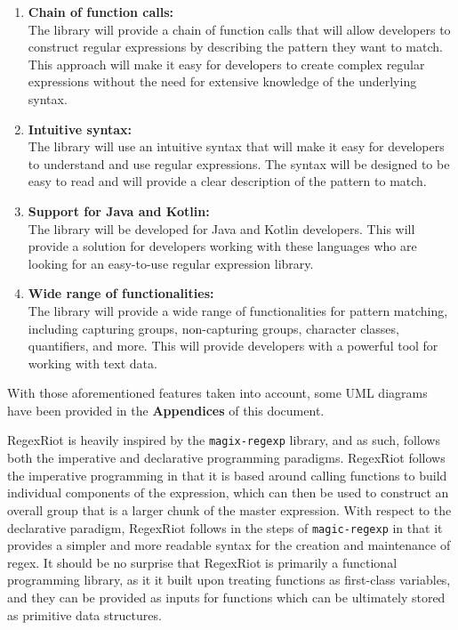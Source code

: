 \documentclass[conference]{IEEEtran}
\begin{document}
\begin{enumerate}
    \item \textbf{Chain of function calls:}\\
          The library will provide a chain of function calls that will allow developers
          to construct regular expressions by describing the pattern they want to match.
          This approach will make it easy for developers to create complex regular expressions
          without the need for extensive knowledge of the underlying syntax.

    \item \textbf{Intuitive syntax:}\\
          The library will use an intuitive syntax that will make it easy for developers
          to understand and use regular expressions. The syntax will be designed to be easy
          to read and will provide a clear description of the pattern to match.

    \item \textbf{Support for Java and Kotlin:}\\
          The library will be developed for Java and Kotlin developers. \cite{oracle_docs1997}
          This will provide a solution for developers working with these languages who are
          looking for an easy-to-use regular expression library.\cite{kotlin_docs2023}

          \vfill\eject

    \item \textbf{Wide range of functionalities:}\\
          The library will provide a wide range of functionalities for pattern matching,
          including capturing groups, non-capturing groups, character classes, quantifiers,
          and more. This will provide developers with a powerful tool for working with text data.
\end{enumerate}

With those aforementioned features taken into account,
some UML diagrams have been provided in the \textbf{Appendices} of this
document.

RegexRiot is heavily inspired by the \texttt{magix-regexp} library, and as such,
follows both the imperative and declarative programming paradigms. \cite{magic-regexp}
RegexRiot follows the imperative programming in that it is based around calling functions
to build individual components of the expression, which can then be used to construct an
overall group that is a larger chunk of the master expression. With respect to the
declarative paradigm, RegexRiot follows in the steps of \texttt{magic-regexp}
in that it provides a simpler and more readable syntax for the creation and
maintenance of regex. It should be no surprise that RegexRiot is primarily a functional programming
library, as it it built upon treating functions as first-class variables, and they can be provided as inputs
for functions which can be ultimately stored as primitive data structures.
\end{document}
